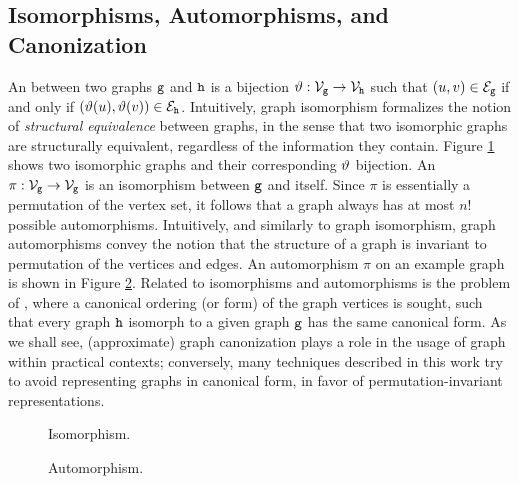 \subsection{Isomorphisms, Automorphisms, and Canonization} \label{sec:isomorphisms}
An  between two graphs $\mathtt{g}$ and $\mathtt{h}$ is a bijection $\Isomorph: \Nodes{g}\rightarrow \Nodes{h}$ such that $(u,v) \in \Edges{g}$ if and only if $(\Isomorph(u),\Isomorph(v)) \in \Edges{h}$. Intuitively, graph isomorphism formalizes the notion of \emph{structural equivalence} between graphs, in the sense that two isomorphic graphs are structurally equivalent, regardless of the information they contain. Figure \ref{fig:isomorphism} shows two isomorphic graphs and their corresponding $\vartheta$ bijection. An  $\pi: \Nodes{g}\rightarrow \Nodes{g}$ is an isomorphism between $\mathtt{g}$ and itself. Since $\pi$ is essentially a permutation of the vertex set, it follows that a graph always has at most $n!$ possible automorphisms. Intuitively, and similarly to graph isomorphism, graph automorphisms convey the notion that the structure of a graph is invariant to permutation of the vertices and edges. An automorphism $\pi$ on an example graph is shown
in Figure \ref{fig:automorphism}. Related to isomorphisms and automorphisms is the problem of , where a canonical ordering (or form) of the graph vertices is sought, such that every graph $\mathtt{h}$ isomorph to a given graph $\mathtt{g}$ has the same canonical form. As we shall see, (approximate) graph canonization plays a role in the usage of graph within practical contexts; conversely, many techniques described in this work try to avoid representing graphs in canonical form, in favor of permutation-invariant representations.

\begin{figure*}
    \begin{subfigure}[b]{0.48\linewidth}
        \centering
        \resizebox{.9\textwidth}{!}{}
        \caption{Isomorphism.}
        \label{fig:isomorphism}
    \end{subfigure}
    \begin{subfigure}[b]{0.48\linewidth}
        \centering
        \resizebox{.9\textwidth}{!}{}
        \caption{Automorphism.}
        \label{fig:automorphism}
    \end{subfigure}
    \caption{An example of isomorphism and automorphism.}
\end{figure*}

